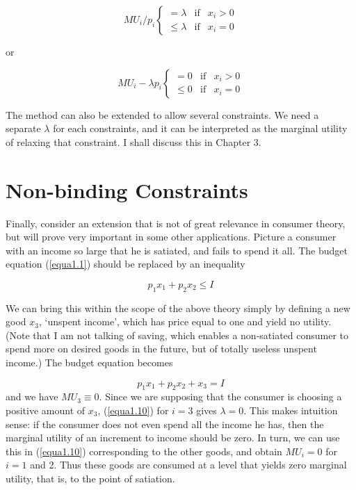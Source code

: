 \begin{equation*}
MU_i / p_i \left\{  \begin{array}{lll}
=\lambda & \mbox{if} & x_i > 0 \\
\leq \lambda & \mbox{if} & x_i=0
\end{array}
\right.
\end{equation*} 

or

\begin{equation} \label{equa1.10}
MU_i - \lambda p_i \left\{  \begin{array}{lll}
=0 & \mbox{if} & x_i > 0 \\
\leq 0 & \mbox{if} & x_i=0
\end{array}
\right.
\end{equation} 

The method can also be extended to allow several constraints. We need a separate $\lambda$ for each constraints, and it can be interpreted as the marginal utility of relaxing that constraint. I shall discuss this in Chapter 3.

\section*{Non-binding Constraints}

Finally, consider an extension that is not of great relevance in consumer theory, but will prove very important in some other applications. Picture a consumer with an income so large that he is satiated, and fails to spend it all. The budget equation (\ref{equa1.1}) should be replaced by an inequality

\begin{equation*}
p_1 x_1 + p_2 x_2 \leq I
\end{equation*} 

We can bring this within the scope of the above theory simply by defining a new good $x_3$, `unspent income', which has price equal to one and yield no utility. (Note that I am not talking of saving, which enables a non-satiated consumer to spend more on desired goods in the future, but of totally useless unspent income.) The budget equation becomes

\begin{equation*}
p_1 x_1 + p_2 x_2 + x_3 = I
\end{equation*} 
and we have $MU_3 \equiv 0$. Since we are supposing that the consumer is choosing a positive amount of $x_3$, (\ref{equa1.10}) for $i=3$ gives $\lambda=0$. This makes intuition sense: if the consumer does not even spend all the income he has, then the marginal utility of an increment to income should be zero. In turn, we can use this in (\ref{equa1.10}) corresponding to the other goods, and obtain $MU_i =0$ for $i=1$ and 2. Thus these goods are consumed at a level that yields zero marginal utility, that is, to the point of satiation.

